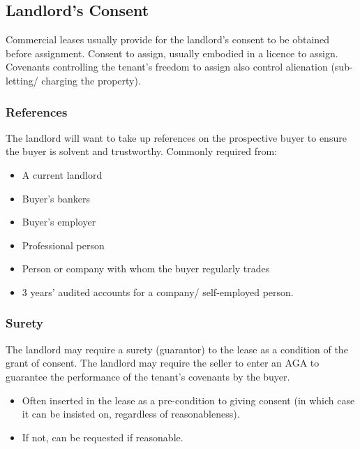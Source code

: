 \documentclass[
]{article}
\providecommand{\tightlist}{%
  \setlength{\itemsep}{0pt}\setlength{\parskip}{0pt}}
\begin{document}
\hypertarget{landlords-consent}{%
\subsection{Landlord's Consent}\label{landlords-consent}}

Commercial leases usually provide for the landlord's consent to be
obtained before assignment. Consent to assign, usually embodied in a
licence to assign. Covenants controlling the tenant's freedom to assign
also control alienation (sub-letting/ charging the property).

\hypertarget{references}{%
\subsubsection{References}\label{references}}

The landlord will want to take up references on the prospective buyer to
ensure the buyer is solvent and trustworthy. Commonly required from:

\begin{itemize}
\tightlist
\item
  A current landlord
\item
  Buyer's bankers
\item
  Buyer's employer
\item
  Professional person
\item
  Person or company with whom the buyer regularly trades
\item
  3 years' audited accounts for a company/ self-employed person.
\end{itemize}

\hypertarget{surety}{%
\subsubsection{Surety}\label{surety}}

The landlord may require a surety (guarantor) to the lease as a
condition of the grant of consent. The landlord may require the seller
to enter an AGA to guarantee the performance of the tenant's covenants
by the buyer.

\begin{itemize}
\tightlist
\item
  Often inserted in the lease as a pre-condition to giving consent (in
  which case it can be insisted on, regardless of reasonableness).
\item
  If not, can be requested if reasonable.
\end{itemize}
\end{document}
